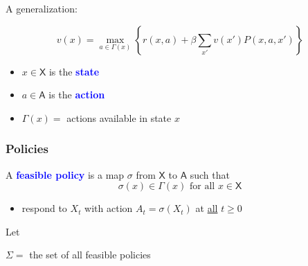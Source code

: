 \documentclass[xcolor=dvipsnames]{beamer}
\renewcommand{\geq}{\geqslant}
\newcommand{\navy}[1]{\textcolor{Blue}{\bf #1}}
\newcommand{\Asf}{\mathsf A}
\newcommand{\Xsf}{\mathsf X}
\renewcommand{\geq}{\geqslant}
\newcommand{\1}{\mathbbm 1}
\begin{document}
\begin{frame}

    A generalization:

    \begin{equation*}
            v(x)
            = \max_{a \in \Gamma(x)}
            \left\{
                r(x, a)
                + \beta
                \sum_{x'} v(x') P(x, a, x')
            \right\}
    \end{equation*}
    \vspace{0.5em}
    \vspace{0.5em}

    \begin{itemize}
        \item $x \in \Xsf$ is the \navy{state}
        \item $a \in \Asf$ is the \navy{action}
        \item $\Gamma(x) =$ actions available in state $x$
    \end{itemize}


\end{frame}






\begin{frame}
    \frametitle{Policies}

    
    A \navy{feasible policy} is a map $\sigma$ from $\Xsf$ to $\Asf$ such that
    \begin{equation*}
            \sigma(x) \in \Gamma(x) \text{ for all } x \in \Xsf
    \end{equation*}

    \begin{itemize}
        \item respond to $X_t$ with action $A_t = \sigma(X_t)$ at 
        \underline{all} $t \geq 0$
    \end{itemize}

    \vspace{0.5em}
    \vspace{0.5em}
    \vspace{0.5em}

    Let 
    \begin{center}
            $\Sigma = $ the set of all feasible policies
    \end{center}




\end{frame}
\end{document}
